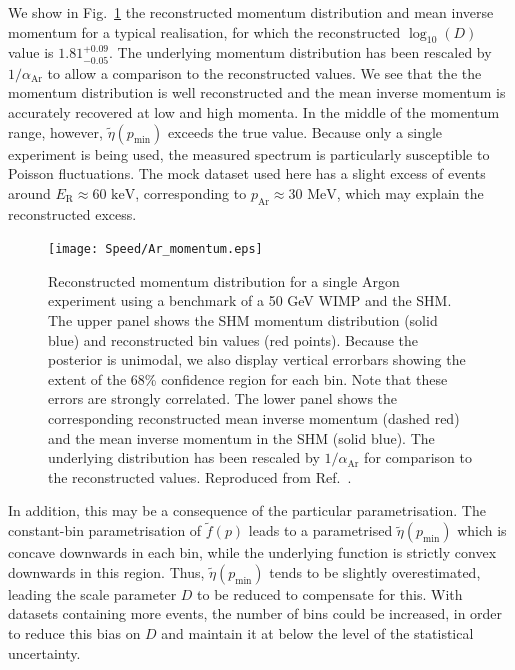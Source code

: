 We show in Fig.\ \ref{fig:Speed:Ar_Momentum} the reconstructed momentum distribution and mean inverse momentum for a typical realisation, for which the reconstructed $\log_{10}(D)$ value is \(1.81_{-0.05}^{+0.09}\). The underlying momentum distribution has been rescaled by \(1/\alpha_\textrm{Ar}\) to allow a comparison to the reconstructed values. We see that the the momentum distribution is well reconstructed and the mean inverse momentum is accurately recovered at low and high momenta. In the middle of the momentum range, however, \(\tilde{\eta}(p_\textrm{min})\) exceeds the true value. Because only a single experiment is being used, the measured spectrum is particularly susceptible to Poisson fluctuations. The mock dataset used here has a slight excess of events around \(E_\textrm{R} \approx 60 \textrm{ keV}\), corresponding to \(p_\textrm{Ar} \approx 30 \textrm{ MeV}\), which may explain the reconstructed excess.

 \begin{figure}[t]
\centering
\texttt{[image: Speed/Ar\_momentum.eps]}
\caption[Reconstructed momentum distribution for a single Argon experiment using a benchmark of a 50 GeV WIMP and the SHM]{Reconstructed momentum distribution for a single Argon experiment using a benchmark of a 50 GeV WIMP and the SHM.  The upper panel shows the SHM momentum distribution (solid blue) and reconstructed bin values (red points). Because the posterior is unimodal, we also display vertical errorbars showing the extent of the 68\% confidence region for each bin. Note that these errors are strongly correlated. The lower panel shows the corresponding reconstructed mean inverse momentum (dashed red) and the mean inverse momentum in the SHM (solid blue). The underlying distribution has been rescaled by \(1/\alpha_{\textrm{Ar}}\) for comparison to the reconstructed values. Reproduced from Ref.~\cite{Kavanagh:2012}.}
  \label{fig:Speed:Ar_Momentum}
\end{figure}


In addition, this may be a consequence of the particular parametrisation. The constant-bin parametrisation of \(\tilde{f}(p)\) leads to a parametrised \(\tilde{\eta}(p_\textrm{min})\) which is concave downwards in each bin, while the underlying function is strictly convex downwards in this region. Thus, \(\tilde{\eta}(p_\textrm{min})\) tends to be slightly overestimated, leading the scale parameter \(D\) to be reduced to compensate for this. With datasets containing more events, the number of bins could be increased, in order to reduce this bias on \(D\) and maintain it at below the level of the statistical uncertainty.


